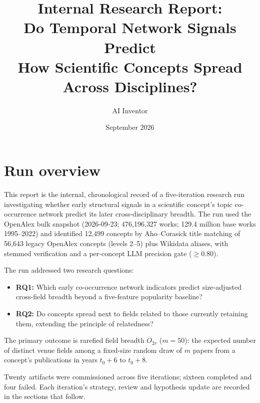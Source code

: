 \documentclass[11pt,letterpaper]{article}
\title{Internal Research Report:\\Do Temporal Network Signals Predict\\How Scientific Concepts Spread Across Disciplines?}
\author{AI Inventor}
\date{September 2026}
\begin{document}
\maketitle
\tableofcontents
\clearpage

\section{Run overview}
\label{sec:overview}

This report is the internal, chronological record of a five-iteration research run investigating whether early structural signals in a scientific concept's topic co-occurrence network predict its later cross-disciplinary breadth. The run used the OpenAlex bulk snapshot (2026-09-23; 476{,}196{,}327 works; 129.4 million base works 1995--2022) and identified 12{,}499 concepts by Aho--Corasick title matching of 56{,}643 legacy OpenAlex concepts (levels 2--5) plus Wikidata aliases, with stemmed verification and a per-concept LLM precision gate ($\geq 0.80$).

The run addressed two research questions:
\begin{itemize}
    \item \textbf{RQ1:} Which early co-occurrence network indicators predict size-adjusted cross-field breadth beyond a five-feature popularity baseline?
    \item \textbf{RQ2:} Do concepts spread next to fields related to those currently retaining them, extending the principle of relatedness?
\end{itemize}

The primary outcome is rarefied field breadth $O_{2r}$ ($m = 50$): the expected number of distinct venue fields among a fixed-size random draw of $m$ papers from a concept's publications in years $t_0 + 6$ to $t_0 + 8$.

Twenty artifacts were commissioned across five iterations; sixteen completed and four failed. Each iteration's strategy, review and hypothesis update are recorded in the sections that follow.
\end{document}
